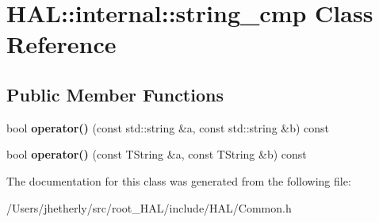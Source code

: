 \hypertarget{class_h_a_l_1_1internal_1_1string__cmp}{\section{H\-A\-L\-:\-:internal\-:\-:string\-\_\-cmp Class Reference}
\label{class_h_a_l_1_1internal_1_1string__cmp}
}
\subsection*{Public Member Functions}
\begin{DoxyCompactItemize}
\item 
\hypertarget{class_h_a_l_1_1internal_1_1string__cmp_a6121a4d8db24e1a14532e04a8267ac28}{bool {\bfseries operator()} (const std\-::string \&a, const std\-::string \&b) const }\label{class_h_a_l_1_1internal_1_1string__cmp_a6121a4d8db24e1a14532e04a8267ac28}

\item 
\hypertarget{class_h_a_l_1_1internal_1_1string__cmp_ab015eb738be89bd65cbcad8640f75916}{bool {\bfseries operator()} (const T\-String \&a, const T\-String \&b) const }\label{class_h_a_l_1_1internal_1_1string__cmp_ab015eb738be89bd65cbcad8640f75916}

\end{DoxyCompactItemize}


The documentation for this class was generated from the following file\-:\begin{DoxyCompactItemize}
\item 
/\-Users/jhetherly/src/root\-\_\-\-H\-A\-L/include/\-H\-A\-L/Common.\-h\end{DoxyCompactItemize}
